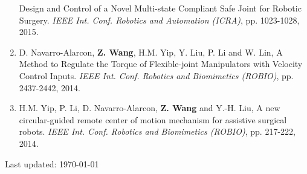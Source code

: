 \documentclass[10pt,letterpaper]{article}
\begin{document}
\begin{enumerate}
  Design and Control of a Novel Multi-state Compliant Safe Joint for Robotic Surgery.
  \textit{{IEEE} Int. Conf. Robotics and Automation (ICRA)}, pp. 1023-1028, 2015.
\item D. Navarro-Alarcon, \textbf{Z. Wang}, H.M. Yip, Y. Liu, P. Li and W. Lin,
  A Method to Regulate the Torque of Flexible-joint Manipulators with Velocity Control Inputs.
  \textit{{IEEE} Int. Conf. Robotics and Biomimetics (ROBIO)}, pp. 2437-2442, 2014.
\item H.M. Yip, P. Li, D. Navarro-Alarcon, \textbf{Z. Wang} and Y.-H. Liu,
  A new circular-guided remote center of motion mechanism for assistive surgical robots.
  \textit{{IEEE} Int. Conf. Robotics and Biomimetics (ROBIO)}, pp. 217-222, 2014.
\end{enumerate}

\bigskip
{\small Last updated: \today}
\end{document}
